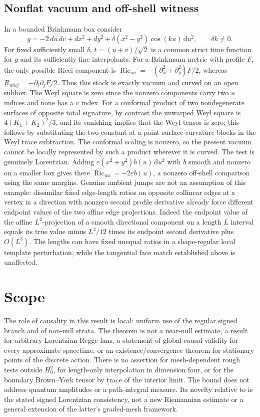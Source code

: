 \documentclass[11pt]{article}
\newcommand{\dd}{\mathrm d}
\newcommand{\Ric}{\operatorname{Ric}}
\begin{document}
\subsection{Nonflat vacuum and off-shell witness}
In a bounded Brinkmann box consider
\[
 g=-2\,du\,dv+dx^2+dy^2+
      \delta (x^2-y^2)\cos(ku)\,\dd u^2,\qquad \delta k\ne0 .
\]
For fixed sufficiently small \(\delta\), \(t=(u+v)/\sqrt2\) is a common strict time function for \(g\) and its sufficiently fine interpolants. For a Brinkmann metric with profile \(F\), the only possible Ricci component is \(\Ric_{uu}=-(\partial_x^2+\partial_y^2)F/2\), whereas \(R_{uiuj}=-\partial_i\partial_jF/2\). Thus this stock is exactly vacuum and curved on an open subbox. The Weyl square is zero since the nonzero components carry two \(u\) indices and none has a \(v\) index. For a conformal product of two nondegenerate surfaces of opposite total signature, by contrast the unwarped Weyl square is \(4(K_1+K_2)^2/3\), and its vanishing implies that the Weyl tensor is zero; this follows by substituting the two constant-at-a-point surface curvature blocks in the Weyl trace subtraction. The conformal scaling is nonzero, so the present vacuum cannot be locally represented by such a product wherever it is curved. The test is genuinely Lorentzian. Adding \(\varepsilon(x^2+y^2)b(u)\,\dd u^2\) with \(b\) smooth and nonzero on a smaller box gives there \(\Ric_{uu}=-2\varepsilon b(u)\), a nonzero off-shell comparison using the same margins. Genuine ambient jumps are not an assumption of this example: dissimilar fixed edge-length ratios on opposite collinear edges at a vertex in a direction with nonzero second profile derivative already force different endpoint values of the two affine edge projections. Indeed the endpoint value of the affine \(L^2\)-projection of a smooth directional component on a length \(L\) interval equals its true value minus \(L^2/12\) times its endpoint second derivative plus \(O(L^3)\). The lengths can have fixed unequal ratios in a shape-regular local template perturbation, while the tangential face match established above is unaffected.

\section{Scope}
The role of causality in this result is local: uniform use of the regular signed branch and of non-null strata. The theorem is not a near-null estimate, a result for arbitrary Lorentzian Regge fans, a statement of global causal validity for every approximate spacetime, or an existence/convergence theorem for stationary points of the discrete action. There is no assertion for mesh-dependent rough tests outside \(H^2_0\), for length-only interpolation in dimension four, or for the boundary Brown--York tensor by trace of the interior limit. The bound does not address quantum amplitudes or a path-integral measure. Its novelty relative to \cite{GN} is the stated signed Lorentzian consistency, not a new Riemannian estimate or a general extension of the latter's graded-mesh framework.
\end{document}
